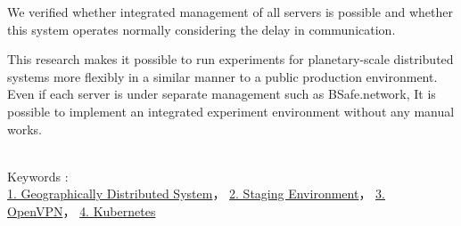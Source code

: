 We verified whether integrated management of all servers is possible and whether this system operates normally considering the delay in communication.

This research makes it possible to run experiments for planetary-scale distributed systems more flexibly in a similar manner to a public production environment.
Even if each server is under separate management such as BSafe.network,
It is possible to implement an integrated experiment environment without any manual works.

~ \\
Keywords : \\
\underline{1. Geographically Distributed System}，
\underline{2. Staging Environment}，
\underline{3. OpenVPN}，
\underline{4. Kubernetes}
\begin{flushright}
\edept \\
\eauthor
\end{flushright}
